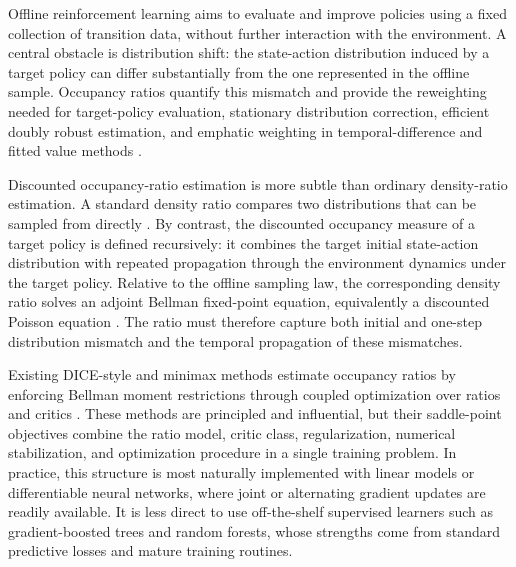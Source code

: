 \documentclass{article}
\newcommand{\1}{\mathbf{1}}
\theoremstyle{plain}
\theoremstyle{definition}
\theoremstyle{remark}
\begin{document}
Offline reinforcement learning aims to evaluate and improve policies using a
fixed collection of transition data, without further interaction with the
environment. A central obstacle is distribution shift: the state-action
distribution induced by a target policy can differ substantially from the one
represented in the offline sample. Occupancy ratios quantify this mismatch and
provide the reweighting needed for target-policy evaluation, stationary
distribution correction, efficient doubly robust estimation, and emphatic
weighting in temporal-difference and fitted value methods
\citep{thomasBrunskill2016DataEfficientOPE,jiangLi2016DoublyRobust,xieEtAl2019MarginalizedIS,yinWang2020EfficientTabularOPE,kallusUehara2020DoubleRL,liuEtAl2018InfiniteHorizonOPE,hallakMannor2017COPTD,suttonEtAl2016EmphaticTD,geladaBellemare2019CovariateShift,vanDerLaanKallus2025StationaryWeightedFQE,vanDerLaanKallus2025SoftFQI}.

Discounted occupancy-ratio estimation is more subtle than ordinary density-ratio
estimation. A standard density ratio compares two distributions that can be
sampled from directly
\citep{tsuboiEtAl2008KLIEP,huangEtAl2006KMM,kanamoriEtAl2009LSIF,nguyenEtAl2010ConvexRatio,menonOng2016DensityRatioClassification,sugiyamaEtAl2012DensityRatioBook}.
By contrast, the discounted occupancy measure of a target policy is defined
recursively: it combines the target initial state-action distribution with
repeated propagation through the environment dynamics under the target policy.
Relative to the offline sampling law, the corresponding density ratio solves an
adjoint Bellman fixed-point equation, equivalently a discounted Poisson
equation
\citep{puterman1994MDP,meynTweedieGlynn2009MarkovChains,glynnMeyn1996PoissonEquation,nachumEtAl2019DualDICE,liuEtAl2018InfiniteHorizonOPE}.
The ratio must therefore capture both initial and one-step distribution mismatch and the
temporal propagation of these mismatches.

Existing DICE-style and minimax methods estimate occupancy ratios by enforcing
Bellman moment restrictions through coupled optimization over ratios and critics
\citep{nachumEtAl2019DualDICE,zhangEtAl2020GenDICE,
zhangEtAl2020GradientDICE,yangEtAl2020RegularizedLagrangianDICE,
daiEtAl2020CoinDICE,ueharaEtAl2020MWLMQL}. These methods are principled and
influential, but their saddle-point objectives combine the ratio model, critic
class, regularization, numerical stabilization, and optimization procedure in a
single training problem. In practice, this structure is most naturally
implemented with linear models or differentiable neural networks, where joint or
alternating gradient updates are readily available. It is less direct to use
off-the-shelf supervised learners such as gradient-boosted trees and random
forests, whose strengths come from standard predictive losses and mature
training routines.
\end{document}
